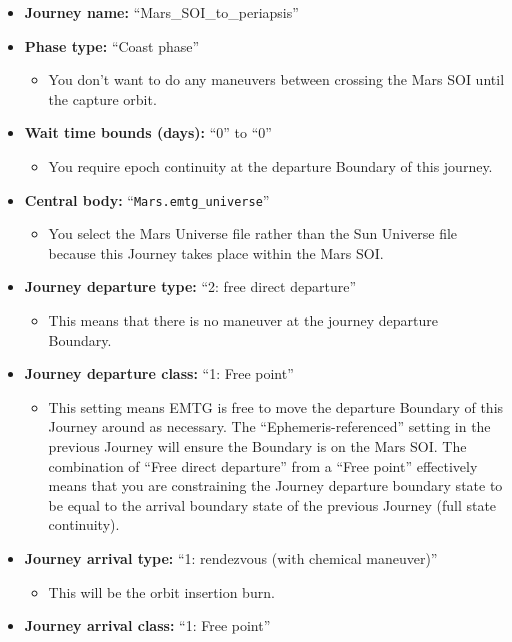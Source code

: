 \documentclass[11pt]{article}
\begin{document}
\begin{itemize}
	\item \textbf{Journey name:} ``Mars\_SOI\_to\_periapsis''
	\item \textbf{Phase type:} ``Coast phase''
	\begin{itemize}
		\item You don’t want to do any maneuvers between crossing the Mars \ac{SOI} until the capture orbit.
	\end{itemize}
	\item \textbf{Wait time bounds (days):} ``0'' to ``0''
	\begin{itemize}
		\item You require epoch continuity at the departure Boundary of this journey.
	\end{itemize}
	\item \textbf{Central body:} ``\texttt{Mars.emtg\_universe}''
	\begin{itemize}
		\item You select the Mars Universe file rather than the Sun Universe file because this Journey takes place within the Mars \ac{SOI}.
	\end{itemize}
	\item \textbf{Journey departure type:} ``2: free direct departure''
	\begin{itemize}
		\item This means that there is no maneuver at the journey departure Boundary.
	\end{itemize}
	\item \textbf{Journey departure class:} ``1: Free point''
	\begin{itemize}
		\item This setting means \ac{EMTG} is free to move the departure Boundary of this Journey around as necessary. The ``Ephemeris-referenced'' setting in the previous Journey will ensure the Boundary is on the Mars \ac{SOI}. The combination of ``Free direct departure'' from a ``Free point'' effectively means that you are constraining the Journey departure boundary state to be equal to the arrival boundary state of the previous Journey (full state continuity).
	\end{itemize}
	\item \textbf{Journey arrival type:} ``1: rendezvous (with chemical maneuver)''
	\begin{itemize}
		\item This will be the orbit insertion burn.
	\end{itemize}
	\item \textbf{Journey arrival class:} ``1: Free point''

\end{itemize}
\end{document}

